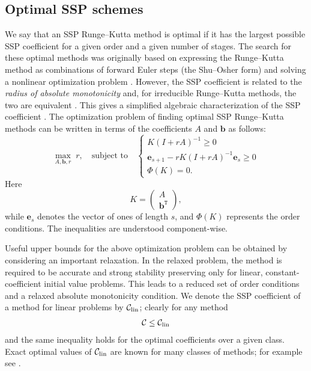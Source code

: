 \subsection{Optimal SSP schemes}\label{subsec:Optimal_SSPRK}
We say that an SSP Runge--Kutta method is optimal if it has the largest 
possible SSP coefficient for a given order and a given number of stages.
The search for these optimal methods was originally based on
expressing the Runge--Kutta method as combinations of forward Euler
steps (the Shu--Osher form) and solving a nonlinear optimization
problem \cite{Gottlieb/Shu:1998, Gottlieb2001, Spiteri2003a, Spiteri2003b, 
Ruuth2004, Ruuth:2006}.
However, the SSP coefficient is related to the 
\emph{radius of absolute monotonicity} \cite{Kraaijevanger1991} and, 
for irreducible Runge--Kutta methods, the two are equivalent 
\cite{Ferracina2004, Higueras2004}.
This gives a simplified algebraic characterization of the SSP coefficient
\cite{Ferracina2005}.
The optimization problem of finding optimal SSP Runge--Kutta methods
can be written in terms of the coefficients $A$ and $\bm{b}$ as
follows:
\begin{equation}\label{eq:SSP_opt}
    \max_{A, \bm{b}, r} \; r, \quad \text{subject to} \quad \left\{
                                                 \begin{array}{ll}
                                                   K(I + rA)^{-1} \geq 0 \\
                                                   \bm{e}_{s+1} - rK(I + rA)^{-1}\bm{e}_{s} \geq 0 \\
                                                   \Phi(K) = 0.
                                                 \end{array}
                                               \right.
\end{equation}
Here
\begin{equation*}
    K = \left(
            \begin{array}{c}
                     A              \\
                     \bm{b}^{\texttt{T}}
            \end{array}
         \right),
\end{equation*}
while $\bm{e}_s$ denotes the vector of ones of length $s$,
and \( \Phi(K) \) represents the  order conditions.
The inequalities are understood component-wise.

Useful upper bounds for the above optimization problem can be obtained 
by considering an important relaxation. 
In the relaxed problem, the method is required to be accurate and strong 
stability preserving only for linear, constant-coefficient initial value problems. 
This leads to a reduced set of order conditions and a relaxed absolute 
monotonicity condition.
We denote the SSP coefficient of a method for linear problems by $\mathcal{C}_{\text{lin}}$; 
clearly for any method
\begin{align*}
	\mathcal{C}\le\mathcal{C}_{\text{lin}}
\end{align*}
and the same inequality holds for the optimal coefficients over a given class.
Exact optimal values of $\mathcal{C}_{\text{lin}}$ are known for many classes of methods; for
example see \cite{Kraaijevanger1986,ketcheson2009a}.


